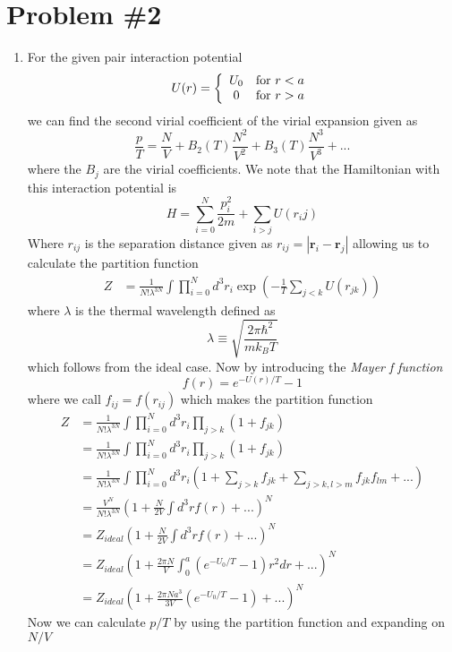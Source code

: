 \documentclass[11pt]{article}
\numberwithin{equation}{section}
\begin{document}
\section{Problem \#2}
\begin{enumerate}[(1)]
\item For the given pair interaction potential
$$U(r) = \left\{\begin{array}{cl}
                U_0    &\textnormal{for}\ r<a\\
                0      &\textnormal{for}\ r>a\\
          \end{array}\right.$$
we can find the second virial coefficient of the virial expansion given as
$$\frac{p}{T} = \frac{N}{V} + B_2(T)\frac{N^2}{V^2} + B_3(T)\frac{N^3}{V^3} + ...$$
where the $B_j$ are the virial coefficients. We note that the Hamiltonian with this
interaction potential is 
$$H = \sum_{i=0}^{N}\frac{p_i^2}{2m} + \sum_{i>j}U(r_ij)$$
Where $r_{ij}$ is the separation distance given as $r_{ij} = |\mathbf{r}_i - \mathbf{r}_j|$
allowing us to calculate the partition function
\begin{align*}
Z &= \frac{1}{N!\lambda^{3N}}\int\prod_{i=0}^{N}d^3r_i\exp\left(-\frac{1}{T}\sum_{j<{k}}U(r_{jk})\right)
\end{align*}
where $\lambda$ is the thermal wavelength defined as
$$\lambda\equiv\sqrt{\frac{2\pi\hbar^2}{mk_BT}}$$
which follows from the ideal case. Now by introducing the \emph{Mayer f function}
$$f(r) = e^{-{U(r)}/T}-1$$
where we call $f_{ij} = f(r_{ij})$ which makes the partition function
\begin{align*}
Z &= \frac{1}{N!\lambda^{3N}}\int\prod_{i=0}^{N}d^3r_i\prod_{j>k}(1+f_{jk})\\
&= \frac{1}{N!\lambda^{3N}}\int\prod_{i=0}^{N}d^3r_i\prod_{j>k}(1+f_{jk})\\
&= \frac{1}{N!\lambda^{3N}}\int\prod_{i=0}^{N}d^3r_i\left(1+\sum_{j>k}f_{jk} + \sum_{j>k,l>m}f_{jk}f_{lm}+...\right)\\
&= \frac{V^N}{N!\lambda^{3N}}\left(1 + \frac{N}{2V}\int d^3rf(r)+...\right)^N\\
&= Z_{ideal}\left(1 + \frac{N}{2V}\int d^3rf(r)+...\right)^N\\
&= Z_{ideal}\left(1 + \frac{2\pi{N}}{V}\int_{0}^{a}(e^{-U_0/T}-1)r^2dr+...\right)^N\\
&= Z_{ideal}\left(1 + \frac{2\pi{N}a^3}{3V}(e^{-U_0/T}-1)+...\right)^N
\end{align*}
Now we can calculate $p/T$ by using the partition function and expanding on $N/V$

\end{enumerate}
\end{document}
